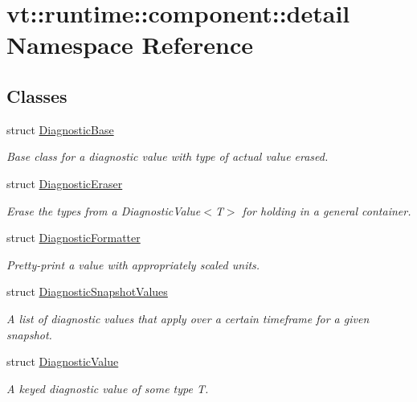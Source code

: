 \hypertarget{namespacevt_1_1runtime_1_1component_1_1detail}{}\section{vt\+:\+:runtime\+:\+:component\+:\+:detail Namespace Reference}
\label{namespacevt_1_1runtime_1_1component_1_1detail}
\subsection*{Classes}
\begin{DoxyCompactItemize}
\item 
struct \hyperlink{structvt_1_1runtime_1_1component_1_1detail_1_1_diagnostic_base}{Diagnostic\+Base}
\begin{DoxyCompactList}\small\item\em Base class for a diagnostic value with type of actual value erased. \end{DoxyCompactList}\item 
struct \hyperlink{structvt_1_1runtime_1_1component_1_1detail_1_1_diagnostic_eraser}{Diagnostic\+Eraser}
\begin{DoxyCompactList}\small\item\em Erase the types from a {\ttfamily Diagnostic\+Value$<$\+T$>$} for holding in a general container. \end{DoxyCompactList}\item 
struct \hyperlink{structvt_1_1runtime_1_1component_1_1detail_1_1_diagnostic_formatter}{Diagnostic\+Formatter}
\begin{DoxyCompactList}\small\item\em Pretty-\/print a value with appropriately scaled units. \end{DoxyCompactList}\item 
struct \hyperlink{structvt_1_1runtime_1_1component_1_1detail_1_1_diagnostic_snapshot_values}{Diagnostic\+Snapshot\+Values}
\begin{DoxyCompactList}\small\item\em A list of diagnostic values that apply over a certain timeframe for a given snapshot. \end{DoxyCompactList}\item 
struct \hyperlink{structvt_1_1runtime_1_1component_1_1detail_1_1_diagnostic_value}{Diagnostic\+Value}
\begin{DoxyCompactList}\small\item\em A keyed diagnostic value of some type {\ttfamily T}. \end{DoxyCompactList}\item 

\end{DoxyCompactItemize}
